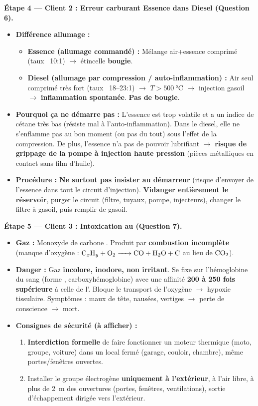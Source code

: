 \documentclass[11pt]{article}
\newcommand{\cle}[1]{{\popxbold\color{popdark}#1}}
\begin{document}
\textbf{Étape 4 — Client 2 : Erreur carburant Essence dans Diesel (Question 6).}
\begin{itemize}
\item \textbf{Différence allumage :}
\begin{itemize}
\item \textbf{Essence (allumage commandé) :} Mélange air+essence comprimé (taux ~10:1) $\rightarrow$ étincelle \textbf{bougie}.
\item \textbf{Diesel (allumage par compression / auto-inflammation) :} Air seul comprimé très fort (taux ~18--23:1) $\rightarrow$ $T > \SI{500}{\celsius}$ $\rightarrow$ injection gasoil $\rightarrow$ \textbf{inflammation spontanée}. \textbf{Pas de bougie}.
\end{itemize}
\item \textbf{Pourquoi ça ne démarre pas :} L'essence est trop volatile et a un indice de cétane très bas (résiste mal à l'auto-inflammation). Dans le diesel, elle ne s'enflamme pas au bon moment (ou pas du tout) sous l'effet de la compression. De plus, l'essence n'a pas de pouvoir lubrifiant $\rightarrow$ \textbf{risque de grippage de la pompe à injection haute pression} (pièces métalliques en contact sans film d'huile).
\item \textbf{Procédure :} \textbf{Ne surtout pas insister au démarreur} (risque d'envoyer de l'essence dans tout le circuit d'injection). \textbf{Vidanger entièrement le réservoir}, purger le circuit (filtre, tuyaux, pompe, injecteurs), changer le filtre à gasoil, puis remplir de gasoil.
\end{itemize}

\textbf{Étape 5 — Client 3 : Intoxication au  (Question 7).}
\begin{itemize}
\item \textbf{Gaz :} \cle{Monoxyde de carbone} . Produit par \textbf{combustion incomplète} (manque d'oxygène : $\ce{C_xH_y + O2 -> CO + H2O + C}$ au lieu de $\ce{CO2}$).
\item \textbf{Danger :} Gaz \textbf{incolore, inodore, non irritant}. Se fixe sur l'hémoglobine du sang (forme , carboxyhémoglobine) avec une affinité \textbf{200 à 250 fois supérieure} à celle de l'. Bloque le transport de l'oxygène $\rightarrow$ hypoxie tissulaire. Symptômes : maux de tête, nausées, vertiges $\rightarrow$ perte de conscience $\rightarrow$ mort.
\item \textbf{Consignes de sécurité (à afficher) :}
\begin{enumerate}
\item \textbf{Interdiction formelle} de faire fonctionner un moteur thermique (moto, groupe, voiture) dans un local fermé (garage, couloir, chambre), même portes/fenêtres ouvertes.
\item Installer le groupe électrogène \textbf{uniquement à l'extérieur}, à l'air libre, à plus de \SI{2}{m} des ouvertures (portes, fenêtres, ventilations), sortie d'échappement dirigée vers l'extérieur.
\end{enumerate}
\end{itemize}
\end{document}
